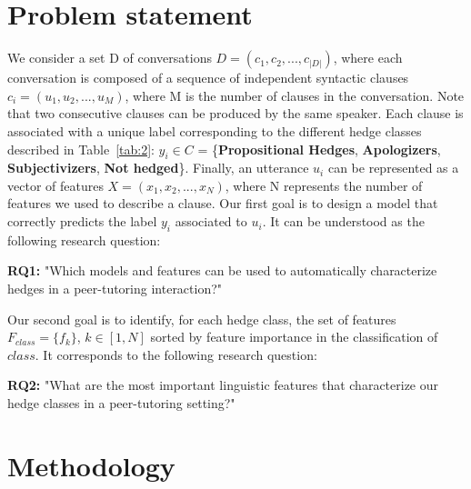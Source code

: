 \documentclass[11pt]{article}
\begin{document}
\section{Problem statement}

\noindent We consider a set D of conversations $D = (c_{1}, c_{2}, ..., c_{|D|})$, where each conversation is composed of a sequence of independent syntactic clauses $c_{i}= (u_{1},u_{2},...,u_{M})$, where M is the number of clauses in the conversation. Note that two consecutive clauses can be produced by the same speaker. 
Each clause is associated with a unique label corresponding to the different hedge classes described in Table~\ref{tab:2}: $y_{i} \in C$ = \{\textbf{Propositional Hedges}, \textbf{Apologizers}, \textbf{Subjectivizers}, \textbf{Not hedged}\}. Finally, an utterance $u_{i}$ can be represented as a vector of features $X = (x_{1}, x_{2}, ..., x_{N})$, where N represents the number of features we used to describe a clause. 
Our first goal is to design a model that correctly predicts the label $y_{i}$ associated to $u_{i}$. It can be understood as the following research question: %

\noindent\textbf{RQ1:} "Which models and features can be used to automatically characterize hedges in a peer-tutoring interaction?" 

\noindent Our second goal is to identify, for each hedge class, the set of features ${F_{class} = \{f_{k}\}}$, $k \in [1,N] $ sorted by feature importance in the classification of $class$. It corresponds to the following research question: %

\noindent\textbf{RQ2:} "What are the most important linguistic features that characterize our hedge classes in a peer-tutoring setting?" \newline

\section{Methodology}
\end{document}
